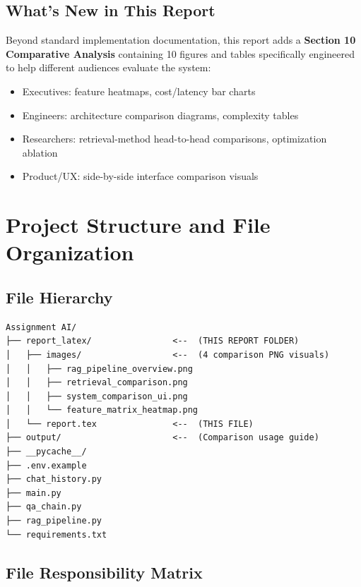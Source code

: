 \documentclass[12pt,a4paper]{article}
\begin{document}
\subsection{What's New in This Report}

Beyond standard implementation documentation, this report adds a \textbf{Section 10 Comparative Analysis} containing 10 figures and tables specifically engineered to help different audiences evaluate the system:
\begin{itemize}
    \item Executives: feature heatmaps, cost/latency bar charts
    \item Engineers: architecture comparison diagrams, complexity tables
    \item Researchers: retrieval-method head-to-head comparisons, optimization ablation
    \item Product/UX: side-by-side interface comparison visuals
\end{itemize}

\newpage

\section{Project Structure and File Organization}

\subsection{File Hierarchy}

\begin{verbatim}
Assignment AI/
├── report_latex/                <--  (THIS REPORT FOLDER)
│   ├── images/                  <--  (4 comparison PNG visuals)
│   │   ├── rag_pipeline_overview.png
│   │   ├── retrieval_comparison.png
│   │   ├── system_comparison_ui.png
│   │   └── feature_matrix_heatmap.png
│   └── report.tex               <--  (THIS FILE)
├── output/                      <--  (Comparison usage guide)
├── __pycache__/
├── .env.example
├── chat_history.py
├── main.py
├── qa_chain.py
├── rag_pipeline.py
└── requirements.txt
\end{verbatim}

\subsection{File Responsibility Matrix}
\end{document}
